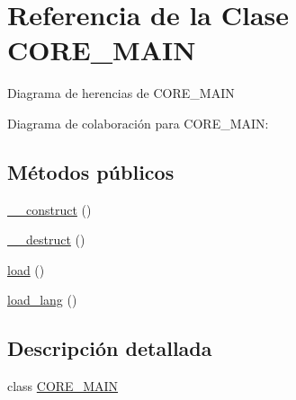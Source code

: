 \hypertarget{class_c_o_r_e___m_a_i_n}{\section{Referencia de la Clase C\-O\-R\-E\-\_\-\-M\-A\-I\-N}
\label{class_c_o_r_e___m_a_i_n}
}


Diagrama de herencias de C\-O\-R\-E\-\_\-\-M\-A\-I\-N


Diagrama de colaboración para C\-O\-R\-E\-\_\-\-M\-A\-I\-N\-:
\subsection*{Métodos públicos}
\begin{DoxyCompactItemize}
\item 
\hyperlink{class_c_o_r_e___m_a_i_n_a095c5d389db211932136b53f25f39685}{\-\_\-\-\_\-construct} ()
\item 
\hyperlink{class_c_o_r_e___m_a_i_n_a421831a265621325e1fdd19aace0c758}{\-\_\-\-\_\-destruct} ()
\item 
\hyperlink{class_c_o_r_e___m_a_i_n_a4dcaa8f72c8423d4de25a9e87fa6f3e4}{load} ()
\item 
\hyperlink{class_c_o_r_e___m_a_i_n_a1d64f5070060eb620b056287d2fcf74a}{load\-\_\-lang} ()
\end{DoxyCompactItemize}


\subsection{Descripción detallada}
class \hyperlink{class_c_o_r_e___m_a_i_n}{C\-O\-R\-E\-\_\-\-M\-A\-I\-N} 

